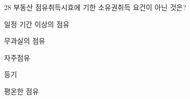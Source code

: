 \begin{question}{28}
부동산 점유취득시효에 기한 소유권취득 요건이 아닌 것은?
\begin{choices}
  \item 일정 기간 이상의 점유
  \item 무과실의 점유
  \item 자주점유
  \item 등기
  \item 평온한 점유
\end{choices}
\end{question}
